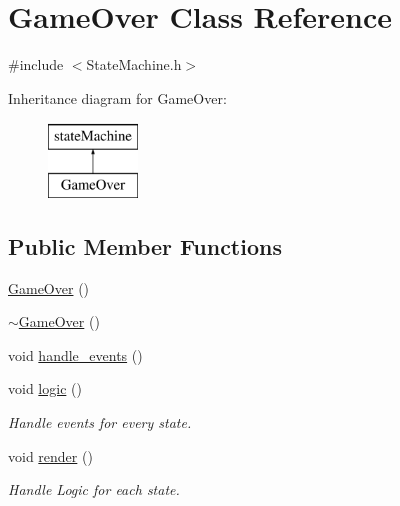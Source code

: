 \hypertarget{class_game_over}{\section{Game\-Over Class Reference}
\label{class_game_over}
}


{\ttfamily \#include $<$State\-Machine.\-h$>$}

Inheritance diagram for Game\-Over\-:\begin{figure}[H]
\begin{center}
\leavevmode
\includegraphics[height=2.000000cm]{class_game_over}
\end{center}
\end{figure}
\subsection*{Public Member Functions}
\begin{DoxyCompactItemize}
\item 
\hyperlink{class_game_over_a0ff11ac73026d574c5b393e825f10a1b}{Game\-Over} ()
\item 
\hyperlink{class_game_over_ae36951a153d25d52fab7cbc7a85bbbbd}{$\sim$\-Game\-Over} ()
\item 
void \hyperlink{class_game_over_ac983ca4c0d92982da2f27a1a3758d91e}{handle\-\_\-events} ()
\item 
void \hyperlink{class_game_over_a4ff51266107ff11b3b10a2e0187eb3f6}{logic} ()
\begin{DoxyCompactList}\small\item\em Handle events for every state. \end{DoxyCompactList}\item 
void \hyperlink{class_game_over_acaf9a4bea8b0e3e051d58b9ff4c80bec}{render} ()
\begin{DoxyCompactList}\small\item\em Handle Logic for each state. \end{DoxyCompactList}\end{DoxyCompactItemize}


